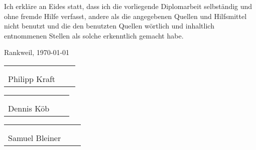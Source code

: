 Ich erkläre an Eides statt, dass ich die vorliegende Diplomarbeit selbständig
und ohne fremde Hilfe verfasst, andere als die angegebenen Quellen und
Hilfsmittel nicht benutzt und die den benutzten Quellen wörtlich und inhaltlich
entnommenen Stellen als solche erkenntlich gemacht habe.

\vspace*{1cm}
Rankweil, \today

\vspace*{2cm}


\begin{center}
  \begin{tabular}{cp{2em}c} \hspace{6cm} \\\cline{1-1}\cline{3-3} \\[-3mm]
    {\footnotesize Philipp Kraft}
  \end{tabular}

  \vspace*{1cm}

  \begin{tabular}{cp{2em}c} \hspace{6cm} \\\cline{1-1}\cline{3-3} \\[-3mm]
    {\footnotesize Dennis Köb}
  \end{tabular}

  \vspace*{1cm}

  \begin{tabular}{cp{2em}c} \hspace{6cm} \\\cline{1-1}\cline{3-3} \\[-3mm]
    {\footnotesize Samuel Bleiner}
  \end{tabular}

\end{center}


